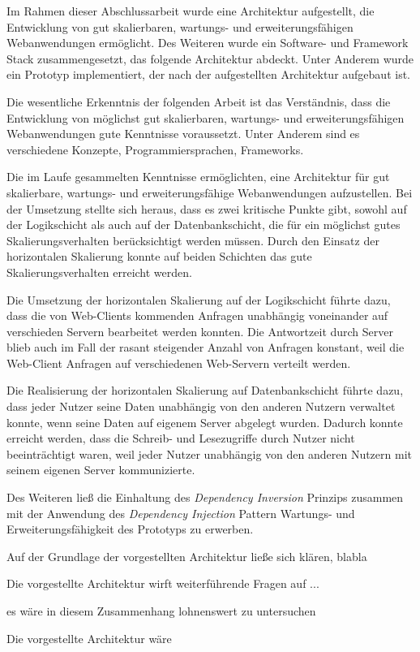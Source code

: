 
Im Rahmen dieser Abschlussarbeit wurde eine Architektur aufgestellt, die Entwicklung von gut skalierbaren, wartungs- und erweiterungsfähigen Webanwendungen ermöglicht. Des Weiteren wurde ein Software- und Framework Stack zusammengesetzt, das folgende Architektur abdeckt. Unter Anderem wurde ein Prototyp implementiert, der nach der aufgestellten Architektur aufgebaut ist.


Die wesentliche Erkenntnis der folgenden Arbeit ist das Verständnis, dass die Entwicklung von möglichst gut skalierbaren, wartungs- und erweiterungsfähigen Webanwendungen gute Kenntnisse voraussetzt. Unter Anderem sind es verschiedene Konzepte, Programmiersprachen, Frameworks.

Die im Laufe gesammelten Kenntnisse ermöglichten, eine Architektur für gut skalierbare, wartungs- und erweiterungsfähige Webanwendungen aufzustellen. Bei der Umsetzung stellte sich heraus, dass es zwei kritische Punkte gibt, sowohl auf der Logikschicht als auch auf der Datenbankschicht, die für ein möglichst gutes Skalierungsverhalten berücksichtigt werden müssen.
Durch den Einsatz der horizontalen Skalierung konnte auf beiden Schichten das gute Skalierungsverhalten erreicht werden.

Die Umsetzung der horizontalen Skalierung auf der Logikschicht führte dazu, dass die von Web-Clients kommenden Anfragen unabhängig voneinander auf verschieden Servern bearbeitet werden konnten. Die Antwortzeit durch Server blieb auch im Fall der rasant steigender Anzahl von Anfragen konstant, weil die Web-Client Anfragen auf verschiedenen Web-Servern verteilt werden.

Die Realisierung der horizontalen Skalierung auf Datenbankschicht führte dazu, dass jeder Nutzer seine Daten unabhängig von den anderen Nutzern verwaltet konnte, wenn seine Daten auf eigenem Server abgelegt wurden. Dadurch konnte erreicht werden, dass die Schreib- und Lesezugriffe durch Nutzer nicht beeinträchtigt waren, weil jeder Nutzer unabhängig von den anderen Nutzern mit seinem eigenen Server kommunizierte.

Des Weiteren ließ die Einhaltung des \textit{Dependency Inversion} Prinzips zusammen mit der Anwendung des \textit{Dependency Injection} Pattern Wartungs- und Erweiterungsfähigkeit des Prototyps zu erwerben. 


Auf der Grundlage der vorgestellten Architektur ließe sich klären, blabla

Die vorgestellte Architektur wirft weiterführende Fragen auf ...

es wäre in diesem Zusammenhang lohnenswert zu untersuchen

Die vorgestellte Architektur wäre 





